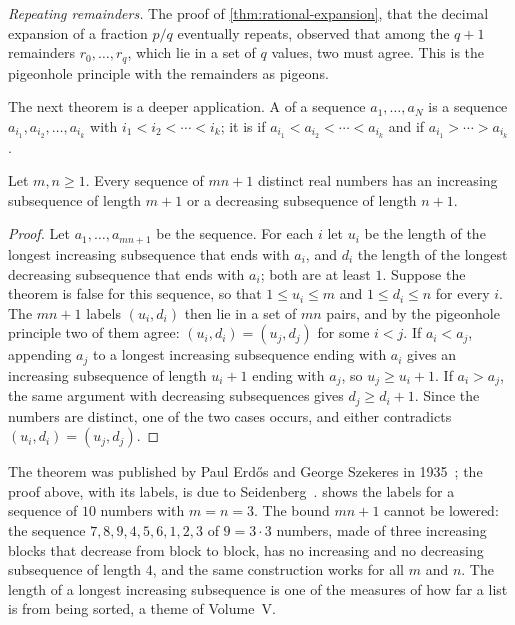 \emph{Repeating remainders.} The proof of \cref{thm:rational-expansion}, that the decimal expansion of a fraction $p/q$ eventually repeats, observed that among the $q+1$ remainders $r_0,\ldots,r_q$, which lie in a set of $q$ values, two must agree. This is the pigeonhole principle with the remainders as pigeons.

The next theorem is a deeper application. A  of a sequence $a_1,\ldots,a_N$ is a sequence $a_{i_1},a_{i_2},\ldots,a_{i_k}$ with $i_1<i_2<\cdots<i_k$; it is  if $a_{i_1}<a_{i_2}<\cdots<a_{i_k}$ and  if $a_{i_1}>\cdots>a_{i_k}$.

\begin{theorem}
\label{thm:erdos-szekeres}
Let $m,n\ge1$. Every sequence of $mn+1$ distinct real numbers has an increasing subsequence of length $m+1$ or a decreasing subsequence of length $n+1$.
\end{theorem}

\begin{proof}
Let $a_1,\ldots,a_{mn+1}$ be the sequence. For each $i$ let $u_i$ be the length of the longest increasing subsequence that ends with $a_i$, and $d_i$ the length of the longest decreasing subsequence that ends with $a_i$; both are at least $1$. Suppose the theorem is false for this sequence, so that $1\le u_i\le m$ and $1\le d_i\le n$ for every $i$. The $mn+1$ labels $(u_i,d_i)$ then lie in a set of $mn$ pairs, and by the pigeonhole principle two of them agree: $(u_i,d_i)=(u_j,d_j)$ for some $i<j$. If $a_i<a_j$, appending $a_j$ to a longest increasing subsequence ending with $a_i$ gives an increasing subsequence of length $u_i+1$ ending with $a_j$, so $u_j\ge u_i+1$. If $a_i>a_j$, the same argument with decreasing subsequences gives $d_j\ge d_i+1$. Since the numbers are distinct, one of the two cases occurs, and either contradicts $(u_i,d_i)=(u_j,d_j)$.
\end{proof}

The theorem was published by Paul Erd\H{o}s and George Szekeres in 1935~\cite{erdos1935}; the proof above, with its labels, is due to Seidenberg~\cite{seidenberg1959}.  shows the labels for a sequence of $10$ numbers with $m=n=3$. The bound $mn+1$ cannot be lowered: the sequence $7,8,9,4,5,6,1,2,3$ of $9=3\cdot3$ numbers, made of three increasing blocks that decrease from block to block, has no increasing and no decreasing subsequence of length $4$, and the same construction works for all $m$ and $n$. The length of a longest increasing subsequence is one of the measures of how far a list is from being sorted, a theme of Volume~V.

